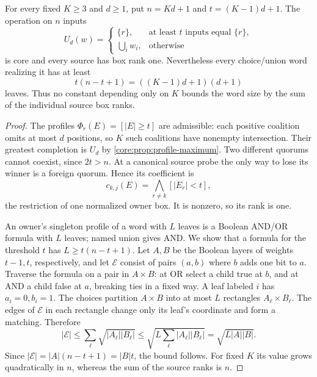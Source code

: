 \begin{proposition}
\label{core:prop:unit-ranks-quadratic}
For every fixed $K\geq3$ and $d\geq1$, put
$n=Kd+1$ and $t=(K-1)d+1$. The operation on $n$ inputs
\[
 U_d(w)=\begin{cases}
 \{r\},&\text{at least $t$ inputs equal }\{r\},\\
 \bigcup_iw_i,&\text{otherwise}
 \end{cases}
\]
is core and every source has box rank one. Nevertheless every
choice/union word realizing it has at least
\[
 t(n-t+1)=((K-1)d+1)(d+1)
\]
leaves. Thus no constant depending only on $K$ bounds the word size
by the sum of the individual source box ranks.
\end{proposition}
\begin{proof}
The profiles $\Phi_r(E)=[|E|\geq t]$ are admissible: each positive
coalition omits at most $d$ positions, so $K$ such coalitions have
nonempty intersection. Their greatest completion is $U_d$ by
\cref{core:prop:profile-maximum}. Two different quorums cannot coexist,
since $2t>n$. At a canonical source probe the only way to lose its
winner is a foreign quorum. Hence its coefficient is
\[
 c_{k,j}(E)=\bigwedge_{r\ne k}[|E_r|<t],
\]
the restriction of one normalized owner box. It is nonzero, so its
rank is one.

An owner's singleton profile of a word with $L$ leaves is a Boolean
AND/OR formula with $L$ leaves; named union gives AND. We show that
a formula for the threshold $t$ has $L\geq t(n-t+1)$.
Let $A,B$ be the Boolean layers of weights $t-1,t$, respectively,
and let $\mathcal E$ consist of pairs $(a,b)$ where $b$ adds one bit
to $a$. Traverse the formula on a pair in $A\times B$: at OR select
a child true at $b$, and at AND a child false at $a$, breaking ties
in a fixed way. A leaf labeled $i$ has $a_i=0,b_i=1$.
The choices partition $A\times B$ into at most $L$ rectangles
$A_\ell\times B_\ell$. The edges of $\mathcal E$ in each rectangle
change only its leaf's coordinate and form a matching. Therefore
\[
 |\mathcal E|\leq\sum_\ell\sqrt{|A_\ell||B_\ell|}
 \leq\sqrt{L\sum_\ell|A_\ell||B_\ell|}
 =\sqrt{L|A||B|}.
\]
Since $|\mathcal E|=|A|(n-t+1)=|B|t$, the bound follows.
For fixed $K$ its value grows quadratically in $n$, whereas the sum
of the source ranks is $n$.
\end{proof}
